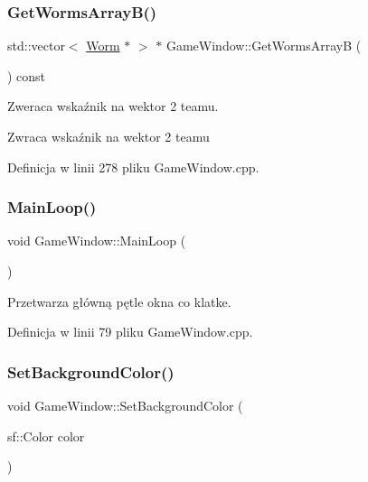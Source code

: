 \subsubsection{\texorpdfstring{Get\+Worms\+Array\+B()}{GetWormsArrayB()}}
{\footnotesize\ttfamily std\+::vector$<$ \mbox{\hyperlink{class_worm}{Worm}} $\ast$ $>$ $\ast$ Game\+Window\+::\+Get\+Worms\+ArrayB (\begin{DoxyParamCaption}{ }\end{DoxyParamCaption}) const}



Zweraca wskaźnik na wektor 2 team\textquotesingle{}u. 

\begin{DoxyReturn}{Zwraca}
wskaźnik na wektor 2 team\textquotesingle{}u 
\end{DoxyReturn}


Definicja w linii 278 pliku Game\+Window.\+cpp.

\mbox{\label{class_game_window_a7dcdd3731da278a522c59a72ecee77b3}} 
\subsubsection{\texorpdfstring{Main\+Loop()}{MainLoop()}}
{\footnotesize\ttfamily void Game\+Window\+::\+Main\+Loop (\begin{DoxyParamCaption}{ }\end{DoxyParamCaption})}



Przetwarza główną pętle okna co klatke. 



Definicja w linii 79 pliku Game\+Window.\+cpp.

\mbox{\label{class_game_window_a856649fd2f3954b6ae3c6cf9da6b17a6}} 
\subsubsection{\texorpdfstring{Set\+Background\+Color()}{SetBackgroundColor()}}
{\footnotesize\ttfamily void Game\+Window\+::\+Set\+Background\+Color (\begin{DoxyParamCaption}\item[{sf\+::\+Color}]{color }\end{DoxyParamCaption})}



